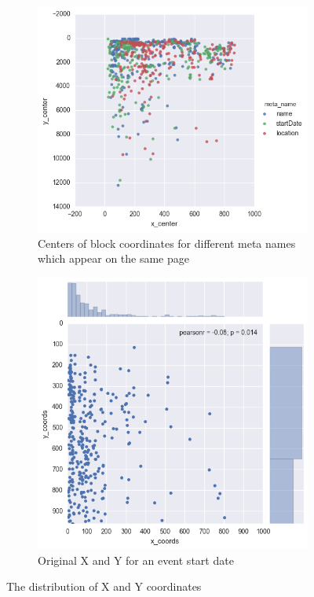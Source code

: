 \begin{figure}[h]
\begin{subfigure}{.5\textwidth}
  \centering
    \includegraphics[width=1\textwidth]{figures07/xyLocNameDate}
    \caption{Centers of block coordinates for different meta names which appear on the same page}
    \label{fig:xyLocNameDate}
\end{subfigure}
\begin{subfigure}{.5\textwidth}
  \centering
    \includegraphics[width=.85\textwidth]{figures07/startDateXY}
    \caption{Original X and Y for an event start date}
    \label{fig:startDateXY}
\end{subfigure}
\caption{The distribution of X and Y coordinates}
\end{figure}


